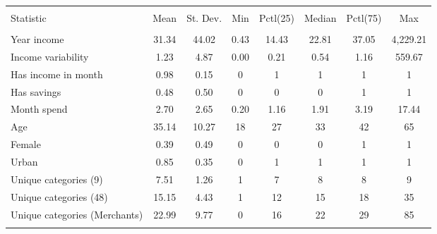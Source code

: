 
\begin{tabular}{@{\extracolsep{5pt}}lccccccc} 
\\[-1.8ex]\hline 
\hline \\[-1.8ex] 
Statistic & \multicolumn{1}{c}{Mean} & \multicolumn{1}{c}{St. Dev.} & \multicolumn{1}{c}{Min} & \multicolumn{1}{c}{Pctl(25)} & \multicolumn{1}{c}{Median} & \multicolumn{1}{c}{Pctl(75)} & \multicolumn{1}{c}{Max} \\ 
\hline \\[-1.8ex] 
Year income & 31.34 & 44.02 & 0.43 & 14.43 & 22.81 & 37.05 & 4,229.21 \\ 
Income variability & 1.23 & 4.87 & 0.00 & 0.21 & 0.54 & 1.16 & 559.67 \\ 
Has income in month & 0.98 & 0.15 & 0 & 1 & 1 & 1 & 1 \\ 
Has savings & 0.48 & 0.50 & 0 & 0 & 0 & 1 & 1 \\ 
Month spend & 2.70 & 2.65 & 0.20 & 1.16 & 1.91 & 3.19 & 17.44 \\ 
Age & 35.14 & 10.27 & 18 & 27 & 33 & 42 & 65 \\ 
Female & 0.39 & 0.49 & 0 & 0 & 0 & 1 & 1 \\ 
Urban & 0.85 & 0.35 & 0 & 1 & 1 & 1 & 1 \\ 
Unique categories (9) & 7.51 & 1.26 & 1 & 7 & 8 & 8 & 9 \\ 
Unique categories (48) & 15.15 & 4.43 & 1 & 12 & 15 & 18 & 35 \\ 
Unique categories (Merchants) & 22.99 & 9.77 & 0 & 16 & 22 & 29 & 85 \\ 
\hline \\[-1.8ex] 
\end{tabular} 
